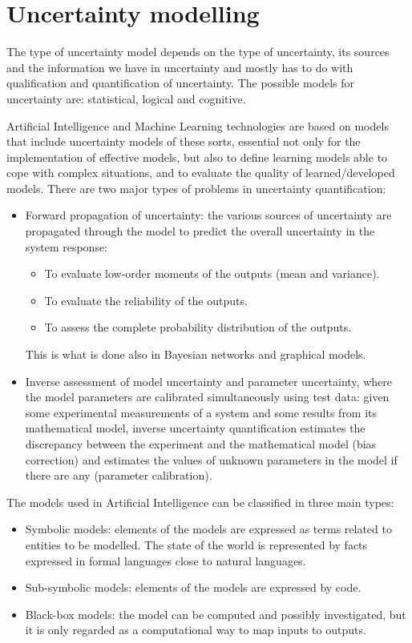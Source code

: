 \documentclass[12pt, a4paper]{report}
\newtheorem[style=M,bodystyle=\normalfont]{theorem}{Theorem}
\newtheorem[style=M,bodystyle=\normalfont]{corollary}{Corollary}
\newtheorem[style=M,bodystyle=\normalfont]{lemma}{Lemma}
\newtheorem[style=M,bodystyle=\normalfont]{definition}{Definition}
\begin{document}
    \section{Uncertainty modelling}
    The type of uncertainty model depends on the type of uncertainty, its sources and the information we have in uncertainty and mostly
    has to do with qualification and quantification of uncertainty. The possible models for uncertainty are: statistical, logical and
    cognitive.

    Artificial Intelligence and Machine Learning technologies are based on models that include uncertainty models of these sorts, essential
    not only for the implementation of effective models, but also to define learning models able to cope with complex situations, and 
    to evaluate the quality of learned/developed models. 
    There are two major types of problems in uncertainty quantification: 
    \begin{itemize}
        \item Forward propagation of uncertainty: the various sources of uncertainty are propagated through the model to predict the overall
            uncertainty in the system response:
            \begin{itemize}
                \item To evaluate low-order moments of the outputs (mean and variance).
                \item To evaluate the reliability of the outputs.
                \item To assess the complete probability distribution of the outputs. 
            \end{itemize}
            This is what is done also in Bayesian networks and graphical models. 
        \item Inverse assessment of model uncertainty and parameter uncertainty, where the model parameters are calibrated simultaneously
            using test data: given some experimental measurements of a system and some results from its mathematical model, inverse 
            uncertainty quantification estimates the discrepancy between the experiment and the mathematical model (bias correction) and
            estimates the values of unknown parameters in the model if there are any (parameter calibration).
    \end{itemize}
    The models used in Artificial Intelligence can be classified in three main types: 
    \begin{itemize}
        \item Symbolic models: elements of the models are expressed as terms related to entities to be modelled. The state of the world is
            represented by facts expressed in formal languages close to natural languages.
        \item Sub-symbolic models: elements of the models are expressed by code. 
        \item Black-box models: the model can be computed and possibly investigated, but it is only regarded as a computational way to map
            inputs to outputs. 
    \end{itemize}
\end{document}
